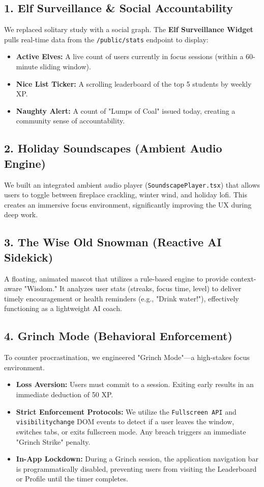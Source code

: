 \documentclass[12pt,a4paper]{article}
\begin{document}
\subsection{1. Elf Surveillance \& Social Accountability}
We replaced solitary study with a social graph. The \textbf{Elf Surveillance Widget} pulls real-time data from the \texttt{/public/stats} endpoint to display:
\begin{itemize}
    \item \textbf{Active Elves:} A live count of users currently in focus sessions (within a 60-minute sliding window).
    \item \textbf{Nice List Ticker:} A scrolling leaderboard of the top 5 students by weekly XP.
    \item \textbf{Naughty Alert:} A count of "Lumps of Coal" issued today, creating a community sense of accountability.
\end{itemize}

\subsection{2. Holiday Soundscapes (Ambient Audio Engine)}
We built an integrated ambient audio player (\texttt{SoundscapePlayer.tsx}) that allows users to toggle between fireplace crackling, winter wind, and holiday lofi. This creates an immersive focus environment, significantly improving the UX during deep work.

\subsection{3. The Wise Old Snowman (Reactive AI Sidekick)}
A floating, animated mascot that utilizes a rule-based engine to provide context-aware "Wisdom." It analyzes user stats (streaks, focus time, level) to deliver timely encouragement or health reminders (e.g., "Drink water!"), effectively functioning as a lightweight AI coach.

\subsection{4. Grinch Mode (Behavioral Enforcement)}
To counter procrastination, we engineered "Grinch Mode"—a high-stakes focus environment.
\begin{itemize}
    \item \textbf{Loss Aversion:} Users must commit to a session. Exiting early results in an immediate deduction of 50 XP.
    \item \textbf{Strict Enforcement Protocols:} We utilize the \texttt{Fullscreen API} and \texttt{visibilitychange} DOM events to detect if a user leaves the window, switches tabs, or exits fullscreen mode. Any breach triggers an immediate "Grinch Strike" penalty.
    \item \textbf{In-App Lockdown:} During a Grinch session, the application navigation bar is programmatically disabled, preventing users from visiting the Leaderboard or Profile until the timer completes.
\end{itemize}
\end{document}
